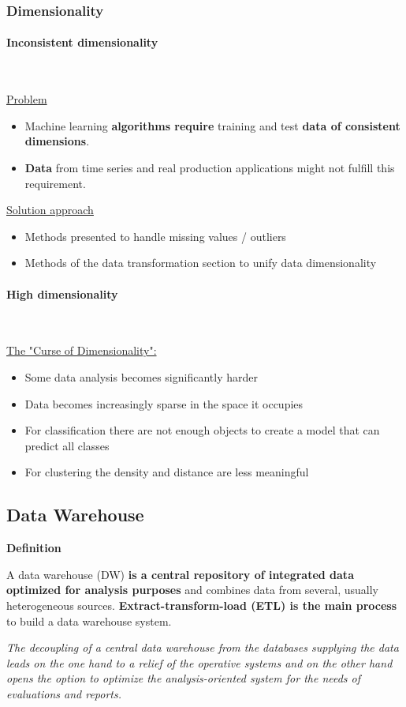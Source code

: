 \documentclass[12pt, a4paper, oneside, justified]{article}
\begin{document}
\subsubsection{Dimensionality}

\paragraph*{Inconsistent dimensionality}~{}

\underline{Problem}
\begin{itemize}
    \item Machine learning \textbf{algorithms require} training and test \textbf{data of consistent dimensions}.
    \item \textbf{Data} from time series and real production applications might not fulfill this requirement.
\end{itemize}

\underline{Solution approach}
\begin{itemize}
    \item Methods presented to handle missing values / outliers
    \item Methods of the data transformation section to unify data dimensionality
\end{itemize}

\paragraph*{High dimensionality}~{}

\underline{The "Curse of Dimensionality":}
\begin{itemize}
    \item Some data analysis becomes significantly harder
    \item Data becomes increasingly sparse in the space it occupies
    \item For classification there are not enough objects to create a model that can predict all classes
    \item For clustering the density and distance are less meaningful
\end{itemize}

\subsection{Data Warehouse}

\textbf{Definition}

A data warehouse (DW) \textbf{is a central repository of integrated data optimized for analysis purposes} 
and combines data from several, usually heterogeneous sources. \textbf{Extract-transform-load (ETL) is the main 
process} to build a data warehouse system.

\textit{The decoupling of a central data warehouse from the databases supplying the data leads on the one hand to 
a relief of the operative systems and on the other hand opens the option to optimize the analysis-oriented 
system for the needs of evaluations and reports.}
\end{document}
